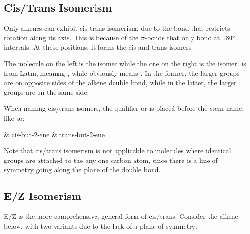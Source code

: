 		\subsection{Cis/Trans Isomerism}

			Only alkenes can exhibit cis-trans isomerism, due to the  bond that restricts rotation along its axis. This is because
			of the $\pi$-bonds that only bond at 180° intervals. At these positions, it forms the cis and trans isomers.


			The molecule on the left is the  isomer while the one on the right is the  isomer. 
			is from Latin, meaning , while  obviously means . In the former,
			the larger groups are on opposite sides of the alkene double bond, while in the latter, the larger groups are on the same
			side.

			When naming cis/trans isomers, the qualifier  or  is placed before the stem name, like so:
			\begin{bulletlist}
				& cis-but-2-ene
				& trans-but-2-ene
			\end{bulletlist}

			Note that cis/trans isomerism is not applicable to molecules where identical groups are attached to the any one carbon atom,
			since there is a line of symmetry going along the plane of the double bond.






		\pagebreak
		\subsection{E/Z Isomerism}

			E/Z is the more comprehensive, general form of cis/trans. Consider the alkene below, with two variants
			due to the lack of a plane of symmetry:


